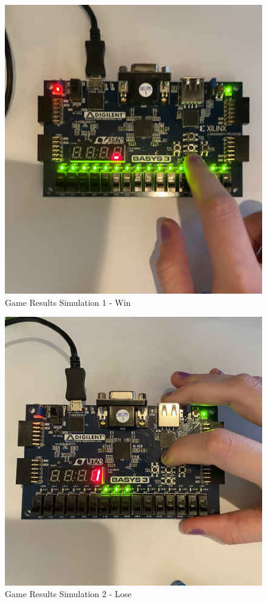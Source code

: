 \documentclass[11pt]{article}
\begin{document}
\clearpage

\begin{figure}[ht]\centering
	\includegraphics[angle=0, width=1.0\textwidth]{IMG_7264.jpg}
	\caption{Game Results Simulation 1 - Win}
	\label{fig:sim_with_table}
\end{figure}
\clearpage

\begin{figure}[ht]\centering
	\includegraphics[angle=0, width=1.0\textwidth]{IMG_7266.jpg}
	\caption{Game Results Simulation 2 - Lose}
	\label{fig:sim_with_table}
\end{figure}
\clearpage
\end{document}
